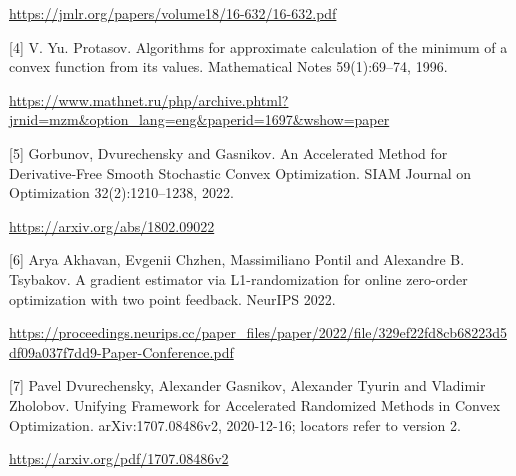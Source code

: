 \documentclass[10pt,a4paper]{article}
\begin{document}
\url{https://jmlr.org/papers/volume18/16-632/16-632.pdf}

[4] V. Yu. Protasov. Algorithms for approximate calculation of the minimum of a convex function from its values. Mathematical Notes 59(1):69--74, 1996.

\url{https://www.mathnet.ru/php/archive.phtml?jrnid=mzm&option_lang=eng&paperid=1697&wshow=paper}

[5] Gorbunov, Dvurechensky and Gasnikov. An Accelerated Method for Derivative-Free Smooth Stochastic Convex Optimization. SIAM Journal on Optimization 32(2):1210--1238, 2022.

\url{https://arxiv.org/abs/1802.09022}

[6] Arya Akhavan, Evgenii Chzhen, Massimiliano Pontil and Alexandre B. Tsybakov. A gradient estimator via L1-randomization for online zero-order optimization with two point feedback. NeurIPS 2022.

\url{https://proceedings.neurips.cc/paper_files/paper/2022/file/329ef22fd8cb68223d5df09a037f7dd9-Paper-Conference.pdf}

[7] Pavel Dvurechensky, Alexander Gasnikov, Alexander Tyurin and Vladimir Zholobov. Unifying Framework for Accelerated Randomized Methods in Convex Optimization. arXiv:1707.08486v2, 2020-12-16; locators refer to version 2.

\url{https://arxiv.org/pdf/1707.08486v2}
\end{document}
